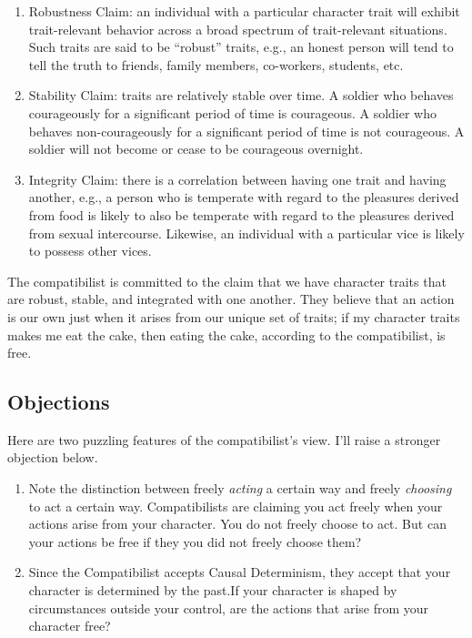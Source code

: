 \documentclass[]{article}
\begin{document}
\begin{enumerate}
\def\labelenumi{\arabic{enumi}.}
\item
  Robustness Claim: an individual with a particular character trait will
  exhibit trait-relevant behavior across a broad spectrum of
  trait-relevant situations. Such traits are said to be ``robust''
  traits, e.g., an honest person will tend to tell the truth to friends,
  family members, co-workers, students, etc.
\item
  Stability Claim: traits are relatively stable over time. A soldier who
  behaves courageously for a significant period of time is courageous. A
  soldier who behaves non-courageously for a significant period of time
  is not courageous. A soldier will not become or cease to be courageous
  overnight.
\item
  Integrity Claim: there is a correlation between having one trait and
  having another, e.g., a person who is temperate with regard to the
  pleasures derived from food is likely to also be temperate with regard
  to the pleasures derived from sexual intercourse. Likewise, an
  individual with a particular vice is likely to possess other vices.
\end{enumerate}

The compatibilist is committed to the claim that we have character
traits that are robust, stable, and integrated with one another. They
believe that an action is our own just when it arises from our unique
set of traits; if my character traits makes me eat the cake, then eating
the cake, according to the compatibilist, is free.

\subsection{Objections}\label{objections}

Here are two puzzling features of the compatibilist's view. I'll raise a
stronger objection below.

\begin{enumerate}
\def\labelenumi{\arabic{enumi}.}
\item
  Note the distinction between freely \emph{acting} a certain way and
  freely \emph{choosing} to act a certain way. Compatibilists are
  claiming you act freely when your actions arise from your character.
  You do not freely choose to act. But can your actions be free if they
  you did not freely choose them?
\item
  Since the Compatibilist accepts Causal Determinism, they accept that
  your character is determined by the past.If your character is shaped
  by circumstances outside your control, are the actions that arise from
  your character free?
\end{enumerate}
\end{document}
